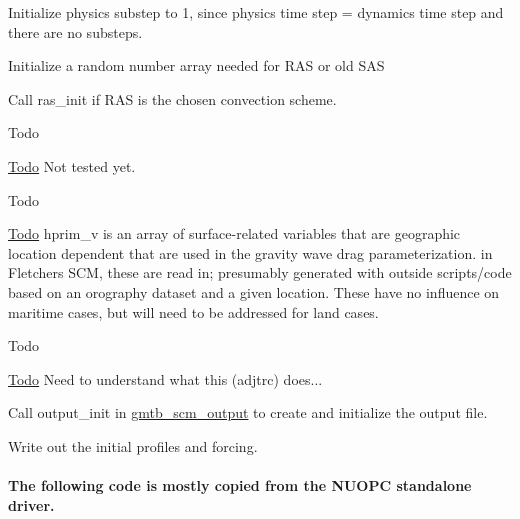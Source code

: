 \begin{DoxyItemize}
\item Initialize physics substep to 1, since physics time step = dynamics time step and there are no substeps.
\item Initialize a random number array needed for R\+AS or old S\+AS
\item Call ras\+\_\+init if R\+AS is the chosen convection scheme.\begin{DoxyRefDesc}{Todo}
\item[\hyperlink{todo__todo000006}{Todo}]Not tested yet. \end{DoxyRefDesc}

\item \begin{DoxyRefDesc}{Todo}
\item[\hyperlink{todo__todo000007}{Todo}]hprim\+\_\+v is an array of surface-\/related variables that are geographic location dependent that are used in the gravity wave drag parameterization. in Fletcher\textquotesingle{}s S\+CM, these are read in; presumably generated with outside scripts/code based on an orography dataset and a given location. These have no influence on maritime cases, but will need to be addressed for land cases. \end{DoxyRefDesc}

\item \begin{DoxyRefDesc}{Todo}
\item[\hyperlink{todo__todo000008}{Todo}]Need to understand what this (adjtrc) does... \end{DoxyRefDesc}

\item Call output\+\_\+init in \hyperlink{group__output}{gmtb\+\_\+scm\+\_\+output} to create and initialize the output file.
\item Write out the initial profiles and forcing.
\end{DoxyItemize}\hypertarget{group___s_c_m_standalone}{}\paragraph{The following code is mostly copied from the N\+U\+O\+P\+C standalone driver.}\label{group___s_c_m_standalone}

